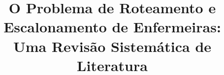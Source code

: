 \documentclass[conference]{IEEEtran}
\begin{document}
\title{O Problema de Roteamento e Escalonamento de Enfermeiras: Uma Revisão Sistemática de Literatura\\
}


\maketitle
\end{document}
